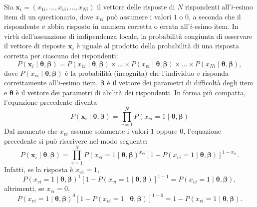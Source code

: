 Sia  $\boldsymbol{x}_i = (x_{1i}, \dots, x_{vi}, \dots, x_{Ni})$ il vettore delle risposte di $N$ rispondenti all'$i$-esimo item di un questionario,  dove $x_{vi}$ può assumere i valori $1$  o $0$, a seconda che il rispondente $v$ abbia risposto in maniera corretta o errata  all'$i$-esimo item. In virtù dell'assunzione di indipendenza locale, la probabilità congiunta di osservare il vettore di risposte $\boldsymbol{x}_i$ è uguale al prodotto della probabilità di una risposta corretta per ciascuno dei  rispondenti:
\begin{equation}
P(\boldsymbol{x}_i \mid \boldsymbol{\theta},  \boldsymbol{\beta}) = P(x_{1i} \mid \boldsymbol{\theta}, \boldsymbol{\beta}) \times \dots \times P(x_{vi} \mid  \boldsymbol{\theta}, \boldsymbol{\beta}) \times \dots \times  P(x_{Ni} \mid \boldsymbol{\theta},  \boldsymbol{\beta}),
\end{equation}
dove $P(x_{vi}\mid \boldsymbol{\theta},  \boldsymbol{\beta})$ è la probabilità (incognita) che l'individuo $v$ risponda correttamente all'$i$-esimo item,  $\boldsymbol{\beta}$ è il vettore dei parametri di difficoltà degli item e $\boldsymbol{\theta}$ è il vettore dei parametri di abilità dei rispondenti. 
In forma più compatta, l'equazione precedente diventa
\begin{equation}
P(\boldsymbol{x}_i \mid  \boldsymbol{\theta},  \boldsymbol{\beta}) = \prod_{v=1}^N  P(x_{vi}=1 \mid  \boldsymbol{\theta},  \boldsymbol{\beta}) 
\end{equation}
Dal momento che  $x_{vi}$ assume solamente i valori $1$ oppure $0$, l'equazione precedente si può riscrivere nel modo seguente:
\begin{equation}
P(\boldsymbol{x}_i \mid \boldsymbol{\theta}, \boldsymbol{\beta})= \prod_{v=1}^N  P(x_{vi}=1 \mid \boldsymbol{\theta}, \boldsymbol{\beta})^{x_{vi}} [1- P(x_{vi}=1 \mid \boldsymbol{\theta}, \boldsymbol{\beta})]^{1-x_{vi}}.
\end{equation}
\noindent
Infatti, se la risposta è $x_{v1}=1$,
\begin{equation*}
P(x_{vi}=1\mid \boldsymbol{\theta},  \boldsymbol{\beta})^{1} [1- P(x_{vi}=1 \mid \boldsymbol{\theta}, \boldsymbol{\beta})]^{1-1}= P(x_{vi}=1 \mid \boldsymbol{\theta},  \boldsymbol{\beta}),
\end{equation*}
\noindent
altrimenti, se  $x_{vi}=0$,
\begin{equation*}
P(x_{vi}=1 \mid \boldsymbol{\theta}, \boldsymbol{\beta})^{0} [1- P(x_{vi}=1 \mid \boldsymbol{\theta}, \boldsymbol{\beta})]^{1-0} = 1- P(x_{vi}=1 \mid \boldsymbol{\theta},  \boldsymbol{\beta}).
\end{equation*}


